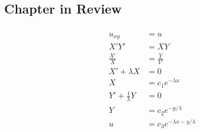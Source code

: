 \documentclass{article}
\begin{document}
\subsection{Chapter in Review}

\subsubsection{}

\begin{align*}
  u_{x y}                  & = u                                \\
  X' Y'                    & = X Y                              \\
  \frac{X'}{X}             & = \frac{Y}{Y'}                     \\
  X' + \lambda X           & = 0                                \\
  X                        & = c_1 e^{-\lambda x}               \\
  Y' + \frac{1}{\lambda} Y & = 0                                \\
  Y                        & = c_2 e^{-y / \lambda}             \\
  u                        & = c_3 e^{-\lambda x - y / \lambda}
\end{align*}

\setcounter{subsubsection}{2}
\subsubsection{}
\end{document}
